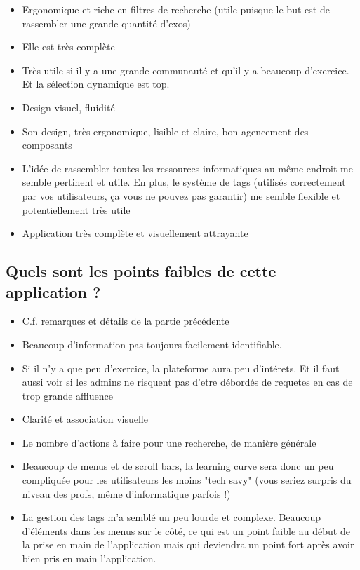 \begin{itemize}
    \item Ergonomique et riche en filtres de recherche (utile puisque le but est de rassembler une grande quantité d'exos)
    \item Elle est très complète
    \item Très utile si il y a une grande communauté et qu'il y a beaucoup d'exercice. Et la sélection dynamique est top.
    \item Design visuel, fluidité
    \item Son design, très ergonomique, lisible et claire, bon agencement des composants
    \item L'idée de rassembler toutes les ressources informatiques au même endroit me semble pertinent et utile. En plus, le système de tags (utilisés correctement par vos utilisateurs, ça vous ne pouvez pas garantir) me semble flexible et potentiellement très utile
    \item Application très complète et visuellement attrayante
\end{itemize}

\subsection*{Quels sont les points faibles de cette application ?}

\begin{itemize}
    \item C.f. remarques et détails de la partie précédente
    \item Beaucoup d'information pas toujours facilement identifiable.
    \item Si il n'y a que peu d'exercice, la plateforme aura peu d'intérets. Et il faut aussi voir si les admins ne risquent pas d'etre débordés de requetes en cas de trop grande affluence
    \item Clarité et association visuelle
    \item Le nombre d'actions à faire pour une recherche, de manière générale
    \item Beaucoup de menus et de scroll bars, la learning curve sera donc un peu compliquée pour les utilisateurs les moins "tech savy" (vous seriez surpris du niveau des profs, même d'informatique parfois !)
    \item La gestion des tags m'a semblé un peu lourde et complexe. Beaucoup d'éléments dans les menus sur le côté, ce qui est un point faible au début de la prise en main de l'application mais qui deviendra un point fort après avoir bien pris en main l'application.
\end{itemize}

